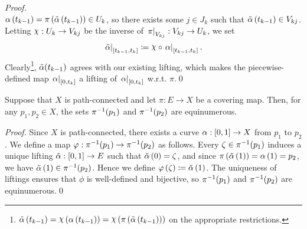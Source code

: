\documentclass[../Moduli_Spaces_of_Riemann_Surfaces.tex]{subfiles}
\begin{document}
\begin{proof}
{\begin{equation*}
            \end{equation*}
        } $\alpha\left(t_{k-1}\right)=\pi\left(\tilde{\alpha}\left(t_{k-1}\right)\right)\in U_k$, so there exists some $j\in J_k$ such that $\tilde{\alpha}\left(t_{k-1}\right)\in V_{kj}$. Letting $\cchi:U_k\to V_{kj}$ be the inverse of $\left.\pi\right|_{V_{kj}}:V_{kj}\to U_k$, we set
        \begin{equation*}
            \l.\tilde{\alpha}\r|_{\l[t_{k-1},t_k\r]}\coloneqq\cchi\circ\l.\alpha\r|_{\l[t_{k-1},t_k\r]}.
        \end{equation*}
        Clearly\footnote{$\tilde{\alpha}\l(t_{k-1}\r)=\cchi\l(\alpha\l(t_{k-1}\r)\r)=\cchi\l(\pi\l(\tilde{\alpha}\l(t_{k-1}\r)\r)\r)$ on the appropriate restrictions.}, $\tilde{\alpha}\!\left(t_{k-1}\right)$ agrees with our existing lifting, which makes the piecewise-defined map $\left.\alpha\right|_{\left[0,t_k\right]}$ a lifting of $\left.\alpha\right|_{\left[0,t_k\right]}$ w.r.t. $\pi$.\qed
    \end{proof}
    \begin{corollary}\label{CS:cor:fiber_cardinalities_coincide}
        Suppose that $X$ is path-connected and let $\pi:E\to X$ be a covering map. Then, for any $p_1,p_2\in X$, the sets $\pi^{-1}\!\left(p_1\right)$ and $\pi^{-1}\!\left(p_2\right)$ are equinumerous.
    \end{corollary}
    \begin{proof}
        Since $X$ is path-connected, there exists a curve $\alpha:\left[0,1\right]\to X$ from $p_1$ to $p_2$. We define a map $\varphi:\pi^{-1}\!\left(p_1\right)\to\pi^{-1}\!\left(p_2\right)$ as follows. Every $\zeta\in\pi^{-1}\!\left(p_1\right)$ induces a unique lifting $\tilde{\alpha}:\left[0,1\right]\to E$ such that $\tilde{\alpha}\left(0\right)=\zeta$, and since $\pi\left(\tilde{\alpha}\left(1\right)\right)=\alpha\left(1\right)=p_2$, we have $\tilde{\alpha}\left(1\right)\in\pi^{-1}\!\left(p_2\right)$. Hence we define $\varphi\left(\zeta\right)\coloneqq\tilde{\alpha}\left(1\right)$. The uniqueness of liftings ensures that $\phi$ is well-defined and bijective, so $\pi^{-1}\!\left(p_1\right)$ and $\pi^{-1}\!\left(p_2\right)$ are equinumerous.\qed
    \end{proof}
\end{document}
